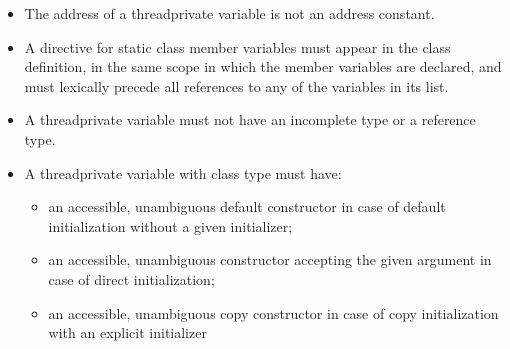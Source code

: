 \begin{itemize}
\item The address of a threadprivate variable is not an address constant.
\ccppspecificend

\cppspecificstart
\item A  directive for static class member variables must appear in the 
class definition, in the same scope in which the member variables are declared, and 
must lexically precede all references to any of the variables in its list.

\item A threadprivate variable must not have an incomplete type or a reference type.

\item A threadprivate variable with class type must have:

\begin{itemize} %
\item an accessible, unambiguous default constructor in case of default initialization 
without a given initializer;

\item an accessible, unambiguous constructor accepting the given argument in case of 
direct initialization;

\item an accessible, unambiguous copy constructor in case of copy initialization with an 
explicit initializer
\end{itemize} %
\cppspecificend

\end{itemize} %

